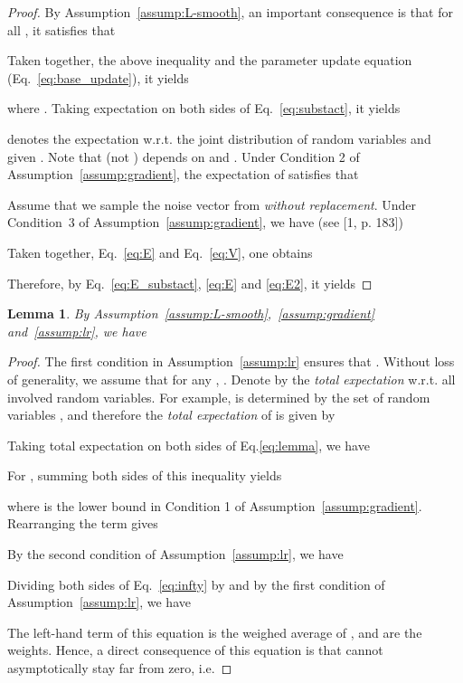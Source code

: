 \documentclass{article}
\newtheorem{lemma}{Lemma}[section]
\begin{document}
\begin{proof}
By Assumption~\ref{assump:L-smooth}, an important consequence is that for all , it satisfies that

Taken together, the above inequality and the parameter update equation (Eq.~\ref{eq:base_update}), it yields 


where . Taking expectation on both sides of Eq.~\ref{eq:substact}, it yields

 denotes the expectation w.r.t. the joint distribution of random variables  and  given . Note that  (not ) depends on  and . Under Condition 2 of Assumption~\ref{assump:gradient}, the expectation of  satisfies that

Assume that we sample the noise vector  from  \emph{without replacement}. Under Condition~3 of Assumption~\ref{assump:gradient}, we have (see [1, p. 183])

Taken together,  Eq.~\ref{eq:E} and Eq.~\ref{eq:V}, one obtains

Therefore, by Eq.~\ref{eq:E_substact}, \ref{eq:E} and \ref{eq:E2}, it yields

\end{proof}

\begin{lemma}\label{lemma:liminf}
By Assumption~\ref{assump:L-smooth},~\ref{assump:gradient} and~\ref{assump:lr}, we have

\end{lemma}

\begin{proof}
The first condition in Assumption~\ref{assump:lr} ensures that . Without loss of generality, we assume that for any , . Denote by  the \emph{total expectation} w.r.t. all involved random variables. For example,  is determined by the set of random variables , and therefore the \emph{total expectation} of  is given by


Taking total expectation 
on both sides of Eq.\ref{eq:lemma}, we have

For , summing both sides of this inequality yields

where  is the lower bound in Condition 1 of Assumption~\ref{assump:gradient}. Rearranging the term gives

By the second condition of Assumption~\ref{assump:lr}, we have

Dividing both sides of Eq.~\ref{eq:infty} by  and by the first condition of Assumption~\ref{assump:lr}, we have

The left-hand term of this equation is the weighed average of , and  are the weights. Hence, a direct consequence of this equation is that  cannot asymptotically stay far from zero, i.e.

\end{proof}
\end{document}
